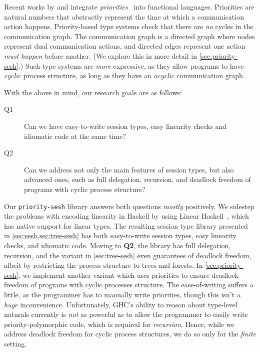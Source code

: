 \documentclass[sigplan,screen]{acmart}
\begin{document}
Recent works by \citet{padovaninovara15} and \citet[PGV,][]{kokkedardha21} integrate \emph{priorities}~\cite{kobayashi06,padovani14} into functional languages. Priorities are natural numbers that abstractly represent the time at which a communication action happens. Priority-based type systems check that there are \emph{no} cycles in the communication graph. The communication graph is a directed graph where nodes represent dual communication actions, and directed edges represent one action \emph{must happen} before another. (We explore this in more detail in \cref{sec:priority-sesh}.) Such type systems are \emph{more} expressive, as they allow programs to have \emph{cyclic} process structure, as long as they have an \emph{acyclic} communication graph.

With the above in mind, our research goals are as follows:
\begin{description}
\item[Q1]
  Can we have easy-to-write session types, easy linearity checks and idiomatic code at the same time?
\item[Q2]
  Can we address not only the main features of session types, but also advanced ones, such as full delegation, recursion, and deadlock freedom of programs with cyclic process structure?
\end{description}
Our \texttt{priority-sesh} library answers both questions \emph{mostly} positively. We sidestep the problems with encoding linearity in Haskell by using Linear Haskell~\cite{bernardyboespflug18}, which has native support for linear types. The resulting session type library presented in \cref{sec:sesh,sec:tree-sesh} has both easy-to-write session types, easy linearity checks, and idiomatic code. Moving to \textbf{Q2}, the library has full delegation, recursion, and the variant in \cref{sec:tree-sesh} even guarantees of deadlock freedom, albeit by restricting the process structure to trees and forests. In \cref{sec:priority-sesh}, we implement another variant which uses priorities to ensure deadlock freedom of programs with cyclic processes structure. The ease-of-writing suffers a little, as the programmer has to manually write priorities, though this isn't a \emph{huge} inconvenience. Unfortunately, GHC's ability to reason about type-level naturals currently is \emph{not} as powerful as to allow the programmer to easily write priority-polymorphic code, which is required for \emph{recursion}. Hence, while we address deadlock freedom for cyclic process structures, we do so only for the \emph{finite} setting.
\end{document}
